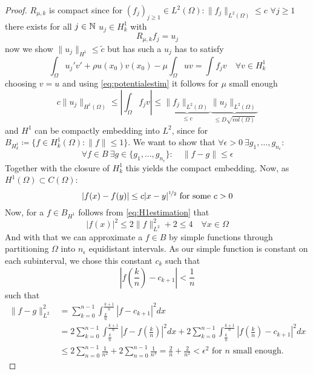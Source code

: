 	\begin{proof}
	$R_{\mu, k}$ is compact since for $(f_{j})_{j \geq 1} \in L^{2}(\Omega): \|f_{j} \|_{L^{2}(\Omega)} \leq c$ $\forall j \geq 1$ there exists for all $j \in \mathbb{N}$  $u_{j} \in H^{1}_{k}$ with
		\[ R_{\mu, k} f_{j} = u_{j} \]
	now we show $\| u_{j} \|_{H^{1}} \leq \tilde{c}$ but has such a $u_{j}$ has to satisfy
		\[ \int_{\Omega} u_{j}' v' + \rho u(x_{0}) v(x_{0}) - \mu \int_{\Omega} u v = \int f_{j} v \quad \forall v \in H^{1}_{k} \]
	choosing $v = u$ and using \eqref{eq:potentialestim} it follows for $\mu$ small enough
		\[ c \| u_{j} \|_{H^{1}(\Omega)} \leq | \int_{\Omega} f_{j} v | \leq \underbrace{\| f_{j} \|_{L^{2}(\Omega)}}_{\leq c} \underbrace{\| u_{j} \|_{L^{2}(\Omega)}}_{\leq D \sqrt{vol(\Omega)}} \]
	and $H^{1}$ can be compactly embedding into $L^{2}$, since for $B_{H^{1}_{k}} \coloneqq \{ f \in H^{1}_{k}(\Omega) : \| f \| \leq 1 \}$. We want to show that $\forall \epsilon > 0 ~\exists g_{1}, \dotsc, g_{n_{\epsilon}}$:
	\[ \forall f \in B ~\exists g \in \{ g_{1}, \dotsc, g_{n_{\epsilon}} \} : \quad \| f - g \|\leq \epsilon \]
	Together with the closure of $H^{1}_{k}$ this yields the compact embedding. Now, as $H^1(\Omega) \subset C(\Omega)$: 
		\begin{equation}
			|f(x) - f(y)| \leq c |x - y|^{\nicefrac{1}{2}} \text{ for some } c > 0 \label{eq:H1estimation}
		\end{equation} 
		Now, for a $f \in B_{H^{1}}$ follows from \eqref{eq:H1estimation} that 
		\[ |f(x)|^{2} \leq 2 \| f \|^{2}_{L^{2}} + 2 \leq 4 \quad \forall x \in \Omega\]
		And with that we can approximate a $f \in B$ by simple functions through partitioning $\Omega$ into $n_{\epsilon}$ equidistant intervals. As our simple function is constant on each subinterval, we chose this constant $c_{k}$ such that
		\[ |f(\frac{k}{n}) - c_{k + 1}| < \frac{1}{n}  \]
		such that
		\begin{align*}
			\| f - g \|^{2}_{L^{2}} & = \sum_{k = 0}^{n-1} \int_{\frac{k}{n}}^{\frac{k+1}{n}} | f - c_{k+1} |^{2} dx \\
				& =  2 \sum_{k = 0}^{n-1} \int_{\frac{k}{n}}^{\frac{k+1}{n}} | f - f(\frac{k}{n}) |^{2} dx +  2 \sum_{k = 0}^{n-1} \int_{\frac{k}{n}}^{\frac{k+1}{n}} | f(\frac{k}{n}) - c_{k+1} |^{2} dx \\
				& \leq 2 \sum_{n = 0}^{n-1} \frac{1}{n^{2}} + 2 \sum_{n=0}^{n-1} \frac{1}{n^{3}} = \frac{2}{n} + \frac{2}{n^{2}} < \epsilon^{2} \text{ for } n \text{ small enough.}
		\end{align*}		
	\end{proof}	
		
